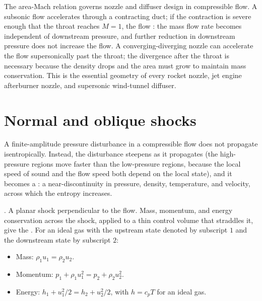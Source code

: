 The area-Mach relation governs nozzle and diffuser design in
compressible flow. A subsonic flow accelerates through a contracting
duct; if the contraction is severe enough that the throat reaches
$M = 1$, the flow : the mass flow rate becomes
independent of downstream pressure, and further reduction in
downstream pressure does not increase the flow. A
converging-diverging nozzle can accelerate the flow supersonically
past the throat; the divergence after the throat is necessary
because the density drops and the area must grow to maintain mass
conservation. This is the essential geometry of every rocket
nozzle, jet engine afterburner nozzle, and supersonic wind-tunnel
diffuser.

\section{Normal and oblique shocks}

A finite-amplitude pressure disturbance in a compressible flow
does not propagate isentropically. Instead, the disturbance steepens
as it propagates (the high-pressure regions move faster than the
low-pressure regions, because the local speed of sound and the
flow speed both depend on the local state), and it becomes a
: a near-discontinuity in pressure, density,
temperature, and velocity, across which the entropy increases.

. A planar shock perpendicular to the flow.
Mass, momentum, and energy conservation across the shock, applied
to a thin control volume that straddles it, give the
. For an ideal gas with the
upstream state denoted by subscript $1$ and the downstream state
by subscript $2$:

\begin{itemize}[leftmargin=*]
  \item Mass: $\rho_1 u_1 = \rho_2 u_2$.
  \item Momentum: $p_1 + \rho_1 u_1^2 = p_2 + \rho_2 u_2^2$.
  \item Energy: $h_1 + u_1^2/2 = h_2 + u_2^2/2$, with $h = c_p T$
    for an ideal gas.
\end{itemize}

